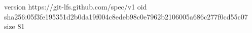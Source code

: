 version https://git-lfs.github.com/spec/v1
oid sha256:05f3fe195351d2b0da19f004c8edeb98c0e7962b2106005a686c277f0cd55c07
size 81
